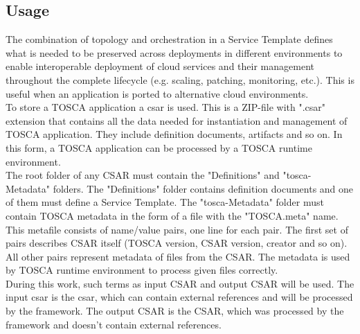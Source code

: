 \subsection*{Usage}
The combination of topology and orchestration in a Service Template defines what is needed to be preserved across deployments in different environments to enable interoperable deployment of cloud services and their management throughout the complete lifecycle (e.g. scaling, patching, monitoring, etc.).
This is useful when an application is ported to alternative cloud environments.~\cite{TOSCA-v1.0_book} \\
%
%
To store a TOSCA application a \gls{csar}\label{sec:csar} is used.
This is a ZIP-file with ".csar" extension that contains all the data needed for instantiation and management of TOSCA application.
They include definition documents, artifacts and so on.
In this form, a TOSCA application can be processed by a TOSCA runtime environment.\\
The root folder of any CSAR must contain the "Definitions" and "\gls{tosca}-Metadata" folders.
The "Definitions" folder contains definition documents and one of them must define a Service Template.
The "\gls{tosca}-Metadata" folder must contain TOSCA metadata in the form of a file with the "TOSCA.meta" name.
This metafile consists of name/value pairs, one line for each pair. 
The first set of pairs describes CSAR itself (TOSCA version, CSAR version, creator and so on). 
All other pairs represent metadata of files from the CSAR. 
The metadata is used by TOSCA runtime environment to process given files correctly.\\
%
During this work, such terms as input CSAR and output CSAR will be used.
The input \gls{csar} is the \gls{csar}, which can contain external references and will be processed by the framework. %
The output CSAR is the CSAR, which was processed by the framework and doesn't contain external references. %


